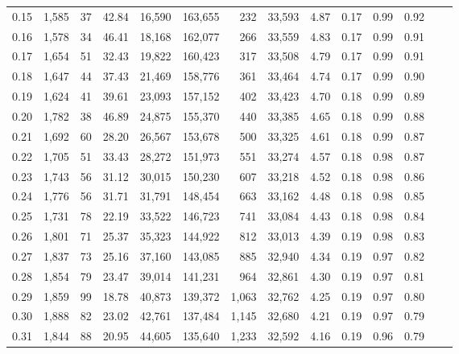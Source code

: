 \begin{tabular}{rrrrrrrrrrrrrr}
0.15 &  1,585 &     37 &   42.84 &   16,590 &  163,655 &     232 &  33,593 &  4.87 &  0.17 &  0.99 &      0.92 \\
0.16 &  1,578 &     34 &   46.41 &   18,168 &  162,077 &     266 &  33,559 &  4.83 &  0.17 &  0.99 &      0.91 \\
0.17 &  1,654 &     51 &   32.43 &   19,822 &  160,423 &     317 &  33,508 &  4.79 &  0.17 &  0.99 &      0.91 \\
0.18 &  1,647 &     44 &   37.43 &   21,469 &  158,776 &     361 &  33,464 &  4.74 &  0.17 &  0.99 &      0.90 \\
0.19 &  1,624 &     41 &   39.61 &   23,093 &  157,152 &     402 &  33,423 &  4.70 &  0.18 &  0.99 &      0.89 \\
0.20 &  1,782 &     38 &   46.89 &   24,875 &  155,370 &     440 &  33,385 &  4.65 &  0.18 &  0.99 &      0.88 \\
0.21 &  1,692 &     60 &   28.20 &   26,567 &  153,678 &     500 &  33,325 &  4.61 &  0.18 &  0.99 &      0.87 \\
0.22 &  1,705 &     51 &   33.43 &   28,272 &  151,973 &     551 &  33,274 &  4.57 &  0.18 &  0.98 &      0.87 \\
0.23 &  1,743 &     56 &   31.12 &   30,015 &  150,230 &     607 &  33,218 &  4.52 &  0.18 &  0.98 &      0.86 \\
0.24 &  1,776 &     56 &   31.71 &   31,791 &  148,454 &     663 &  33,162 &  4.48 &  0.18 &  0.98 &      0.85 \\
0.25 &  1,731 &     78 &   22.19 &   33,522 &  146,723 &     741 &  33,084 &  4.43 &  0.18 &  0.98 &      0.84 \\
0.26 &  1,801 &     71 &   25.37 &   35,323 &  144,922 &     812 &  33,013 &  4.39 &  0.19 &  0.98 &      0.83 \\
0.27 &  1,837 &     73 &   25.16 &   37,160 &  143,085 &     885 &  32,940 &  4.34 &  0.19 &  0.97 &      0.82 \\
0.28 &  1,854 &     79 &   23.47 &   39,014 &  141,231 &     964 &  32,861 &  4.30 &  0.19 &  0.97 &      0.81 \\
0.29 &  1,859 &     99 &   18.78 &   40,873 &  139,372 &   1,063 &  32,762 &  4.25 &  0.19 &  0.97 &      0.80 \\
0.30 &  1,888 &     82 &   23.02 &   42,761 &  137,484 &   1,145 &  32,680 &  4.21 &  0.19 &  0.97 &      0.79 \\
0.31 &  1,844 &     88 &   20.95 &   44,605 &  135,640 &   1,233 &  32,592 &  4.16 &  0.19 &  0.96 &      0.79 \\

\end{tabular}
